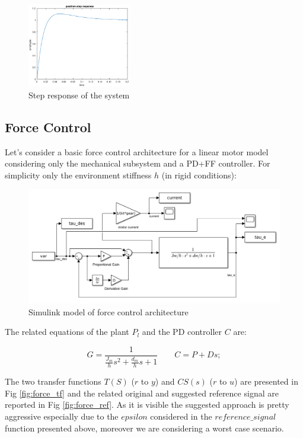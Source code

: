 \documentclass[a4paper,11pt]{article}
\begin{document}
\begin{figure}[H]
\begin{center}
\includegraphics[width=0.4\textwidth]{images/position_step_resp.eps}
\end{center}
\caption{Step response of the system}
\label{fig:position_step_response}
\end{figure}

\newpage
\subsection{Force Control}
Let's consider a basic force control architecture for a linear motor model considering only the mechanical subsystem and a PD+FF controller. For simplicity only the environment stiffness $h$ (in rigid conditions):

\begin{figure}[H]
\begin{center}
\includegraphics[width=1\textwidth]{images/force.png}
\end{center}
\caption{Simulink model of force control architecture}
\label{fig:force_control}
\end{figure}

\noindent The related equations of the plant $P_l$ and the PD controller $C$ are:

\[
G = \frac{1}{\frac{J_m}{h}s^2 + \frac{d_m}{h}s + 1} \qquad
C = P + Ds;                             
\]

\bigskip
\noindent The two transfer functions $T(S)$ ($r$ to $y$) and $CS(s)$ ($r$ to $u$) are presented in Fig \ref{fig:force_tf} and the related original and suggested reference signal are reported in Fig \ref{fig:force_ref}. As it is visible the suggested approach is pretty aggressive especially due to the $epsilon$ considered in the $reference\_signal$ function presented above, moreover we are considering a worst case scenario.
\end{document}
